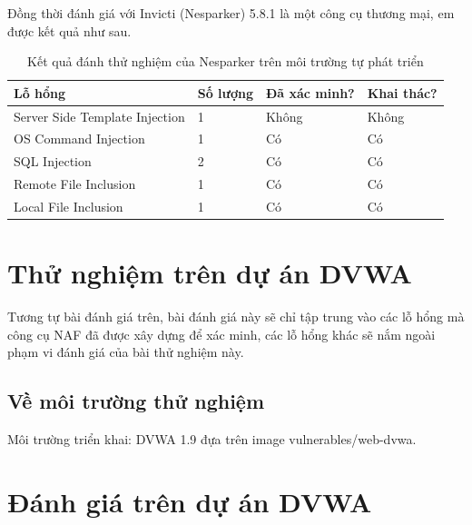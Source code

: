 \documentclass[./../main.tex]{subfiles}
\begin{document}
Đồng thời đánh giá với Invicti (Nesparker) 5.8.1 là một công cụ thương mại,
em được kết quả như sau.
\begin{table}[H]
	\begin{tabular}{|l|l|l|l|}
		\hline
		\textbf{Lỗ hổng}               & \textbf{Số lượng} & \textbf{Đã xác minh?} & \textbf{Khai thác?} \\ \hline
		Server Side Template Injection & 1                 & Không                 & Không               \\ \hline
		OS Command Injection           & 1                 & Có                    & Có                  \\ \hline
		SQL Injection                  & 2                 & Có                    & Có                  \\ \hline
		Remote File Inclusion          & 1                 & Có                    & Có                  \\ \hline
		Local File Inclusion           & 1                 & Có                    & Có                  \\ \hline
	\end{tabular}
	\caption{Kết quả đánh thử nghiệm của Nesparker trên môi trường tự phát triển}

\end{table}

\section{Thử nghiệm trên dự án DVWA}

Tương tự bài đánh giá trên, bài đánh giá này sẽ chỉ tập trung vào các lỗ
hổng mà công cụ NAF đã được xây dựng để xác minh, các lỗ hổng khác sẽ nắm
ngoài phạm vi đánh giá của bài thử nghiệm này.

\subsection{Về môi trường thử nghiệm}

Môi trường triển khai: DVWA 1.9 đựa trên image vulnerables/web-dvwa.

\section{Đánh giá trên dự án DVWA}
\end{document}
